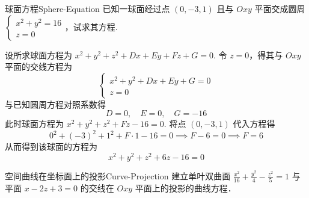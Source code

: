 \begin{problem}{球面方程}{Sphere-Equation}
    已知一球面经过点 $(0, -3, 1)$ 且与 $Oxy$ 平面交成圆周 $\begin{cases} x^2 + y^2 = 16 \\ z = 0 \end{cases}$，试求其方程.
\end{problem}

\begin{solution}
    设所求球面方程为 $x^2 + y^2 + z^2 + Dx + Ey + Fz + G = 0$. 令 $z = 0$，得其与 $Oxy$ 平面的交线方程为
    \begin{equation}
        \begin{cases}
            x^2 + y^2 + Dx + Ey + G = 0 \\
            z = 0
        \end{cases}
    \end{equation}
    与已知圆周方程对照系数得
    \begin{equation}
        D = 0, \quad E = 0, \quad G = -16
    \end{equation}
    此时球面方程为 $x^2 + y^2 + z^2 + Fz - 16 = 0$. 将点 $(0, -3, 1)$ 代入方程得
    \begin{equation}
        0^2 + (-3)^2 + 1^2 + F \cdot 1 - 16 = 0 \implies F - 6 = 0 \implies F = 6
    \end{equation}
    从而得到该球面的方程为
    \begin{equation}
        \boxed{x^2 + y^2 + z^2 + 6z - 16 = 0}
    \end{equation}
\end{solution}


\begin{problem}{空间曲线在坐标面上的投影}{Curve-Projection}
    建立单叶双曲面 $\frac{x^2}{16} + \frac{y^2}{4} - \frac{z^2}{5} = 1$ 与平面 $x - 2z + 3 = 0$ 的交线在 $Oxy$ 平面上的投影的曲线方程．
\end{problem}

